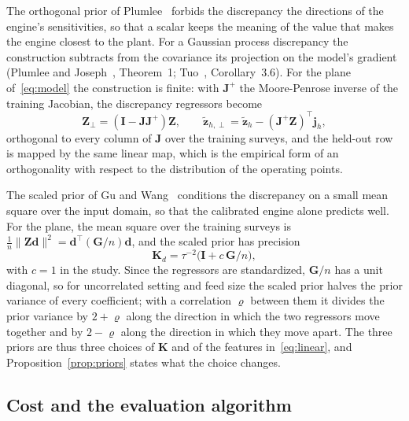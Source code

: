 The orthogonal prior of Plumlee~\cite{plumlee} forbids the discrepancy the directions of the engine's sensitivities, so that
a scalar keeps the meaning of the value that makes the engine closest to the plant. For a Gaussian process discrepancy the
construction subtracts from the covariance its projection on the model's gradient (Plumlee and Joseph~\cite{plumleejoseph},
Theorem~1; Tuo~\cite{tuo}, Corollary~3.6). For the plane of~\eqref{eq:model} the construction is finite: with $\mathbf J^{+}$ the
Moore-Penrose inverse of the training Jacobian, the discrepancy regressors become
\begin{equation}
\mathbf Z_\perp=(\mathbf I-\mathbf J\mathbf J^{+})\mathbf Z,\qquad \tilde{\mathbf z}_{h,\perp}=\tilde{\mathbf z}_h-(\mathbf J^{+}\mathbf Z)^{\top}\mathbf j_h,
\label{eq:orth}
\end{equation}
orthogonal to every column of $\mathbf J$ over the training surveys, and the held-out row is mapped by the same linear map,
which is the empirical form of an orthogonality with respect to the distribution of the operating points.

The scaled prior of Gu and Wang~\cite{guwang} conditions the discrepancy on a small mean square over the input domain, so that
the calibrated engine alone predicts well. For the plane, the mean square over the training surveys is
$\frac1n\|\mathbf Z\mathbf d\|^2=\mathbf d^{\top}(\mathbf G/n)\mathbf d$, and the scaled prior has precision
\begin{equation}
\mathbf K_d=\tau^{-2}\big(\mathbf I+c\,\mathbf G/n\big),
\label{eq:scaled}
\end{equation}
with $c=1$ in the study. Since the regressors are standardized, $\mathbf G/n$ has a unit diagonal, so for uncorrelated
setting and feed size the scaled prior halves the prior variance of every coefficient; with a correlation $\varrho$ between
them it divides the prior variance by $2+\varrho$ along the direction in which the two regressors move together and by
$2-\varrho$ along the direction in which they move apart. The three priors are thus three choices of $\mathbf K$ and of the features in~\eqref{eq:linear}, and
Proposition~\ref{prop:priors} states what the choice changes.

\subsection{Cost and the evaluation algorithm}


